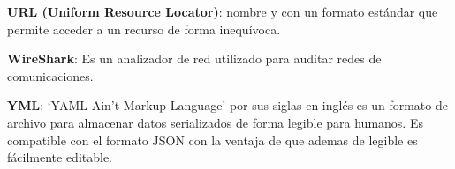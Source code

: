 \textbf{URL (Uniform Resource Locator)}: nombre y con un formato estándar que permite acceder a un recurso de forma inequívoca.
\bigskip

\textbf{WireShark}: Es un analizador de red utilizado para auditar redes de comunicaciones.
\bigskip

\textbf{YML}: `YAML Ain't Markup Language' por sus siglas en inglés es un formato de archivo para almacenar datos serializados de forma legible para humanos. Es compatible con el formato JSON con la ventaja de que ademas de legible es fácilmente editable.

